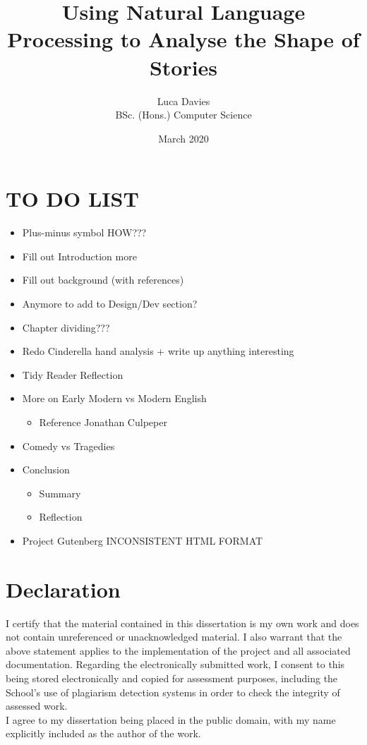 \documentclass{article}
\title{\textbf{Using Natural Language Processing to Analyse the Shape of Stories}}
\author{
Luca Davies \\ BSc. (Hons.) Computer Science}
\date{March 2020}
\begin{document}
\maketitle
\newpage
\section*{TO DO LIST}
    \begin{itemize}
        \item Plus-minus symbol HOW???
        \item Fill out Introduction more
        \item Fill out background (with references)
        \item Anymore to add to Design/Dev section?
        \item Chapter dividing???
        \item Redo Cinderella hand analysis + write up anything interesting
        \item Tidy Reader Reflection
        \item More on Early Modern vs Modern English
            \begin{itemize}
                \item Reference Jonathan Culpeper
            \end{itemize}
        \item Comedy vs Tragedies
        \item Conclusion
            \begin{itemize}
                \item Summary
                \item Reflection
            \end{itemize}
        \item Project Gutenberg INCONSISTENT HTML FORMAT
    \end{itemize}

\section*{Declaration}
    I certify that the material contained in this dissertation is my own work and does not contain unreferenced or unacknowledged material. I also warrant that the above statement applies to the implementation of the project and all associated documentation. Regarding the electronically submitted work, I consent to this being stored electronically and copied for assessment purposes, including the School’s use of plagiarism detection systems in order to check the integrity of assessed work. \\
    I agree to my dissertation being placed in the public domain, with my name explicitly included as the author of the work. \\
    
\end{document}
